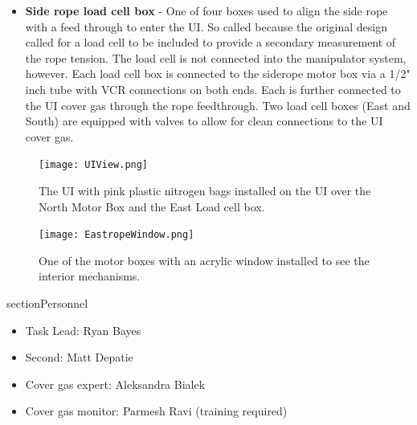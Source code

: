 \documentclass[11pt]{article}
\begin{document}
\begin{itemize}
\item {\bf Side rope load cell box} - One of four boxes used to align the side rope with a feed through to enter the UI. So called because the original design called for a load cell to be included to provide a secondary measurement of the rope tension. The load cell is not connected into the manipulator system, however. Each load cell box is connected to the siderope motor box via a 1/2" inch tube with VCR connections on both ends. Each is further connected to the UI cover gas through the rope feedthrough. Two load cell boxes (East and South) are equipped with valves to allow for clean connections to the UI cover gas.  
\end{itemize}

\begin{figure}[htbp]
\begin{center}
\texttt{[image: UIView.png]}
\caption{The UI with pink plastic nitrogen bags installed on the UI over the North Motor Box and the East Load cell box.}
\label{fig:UI}
\end{center}
\end{figure}


\begin{figure}[htbp]
\begin{center}
\texttt{[image: EastropeWindow.png]}
\caption{One of the motor boxes with an acrylic window installed to see the interior mechanisms.}
\label{fig:eastrope}
\end{center}
\end{figure}

section{Personnel}
\begin{itemize}
\item Task Lead: Ryan Bayes
\item Second: Matt Depatie
\item Cover gas expert: Aleksandra Bialek
\item Cover gas monitor: Parmesh Ravi (training required)
\end{itemize}
\end{document}
